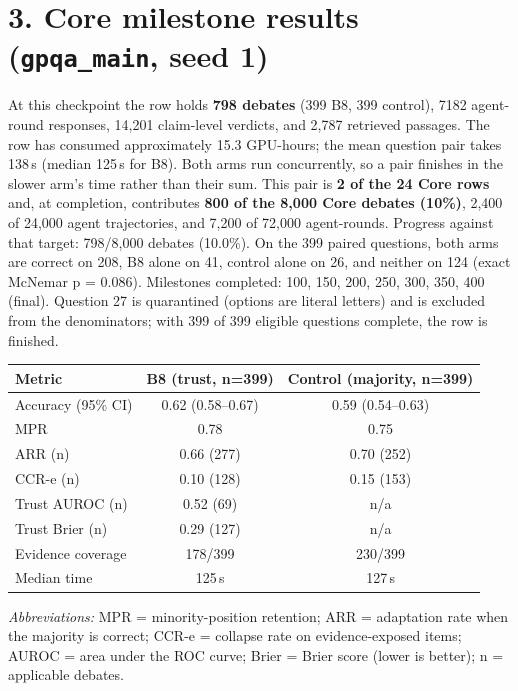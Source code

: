 \section*{3. Core milestone results (\texttt{gpqa\_main}, seed 1)}\label{sec:core}

At this checkpoint the row holds \textbf{798 debates} (399 B8, 399 control), 7182 agent-round responses, 14,201 claim-level verdicts, and 2,787 retrieved passages. The row has consumed approximately 15.3 GPU-hours; the mean question pair takes 138\,s (median 125\,s for B8). Both arms run concurrently, so a pair finishes in the slower arm's time rather than their sum. This pair is \textbf{2 of the 24 Core rows} and, at completion, contributes \textbf{800 of the 8,000 Core debates (10\%)}, 2,400 of 24,000 agent trajectories, and 7,200 of 72,000 agent-rounds. Progress against that target: 798/8,000 debates (10.0\%). On the 399 paired questions, both arms are correct on 208, B8 alone on 41, control alone on 26, and neither on 124 (exact McNemar p = 0.086). Milestones completed: 100, 150, 200, 250, 300, 350, 400 (final). Question 27 is quarantined (options are literal letters) and is excluded from the denominators; with 399 of 399 eligible questions complete, the row is finished.

{\normalsize\setlength{\tabcolsep}{10pt}\renewcommand{\arraystretch}{1.25}
\begin{tabular}{lcc}
\toprule
Metric & B8 (trust, n=399) & Control (majority, n=399) \\
\midrule
Accuracy (95\% CI) & 0.62 (0.58--0.67) & 0.59 (0.54--0.63) \\
MPR & 0.78 & 0.75 \\
ARR (n) & 0.66 (277) & 0.70 (252) \\
CCR-e (n) & 0.10 (128) & 0.15 (153) \\
Trust AUROC (n) & 0.52 (69) & n/a \\
Trust Brier (n) & 0.29 (127) & n/a \\
Evidence coverage & 178/399 & 230/399 \\
Median time & 125\,s & 127\,s \\
\bottomrule
\end{tabular}
}

{\normalsize\textit{Abbreviations:} MPR = minority-position retention; ARR = adaptation rate when the majority is correct; CCR-e = collapse rate on evidence-exposed items; AUROC = area under the ROC curve; Brier = Brier score (lower is better); n = applicable debates.}

